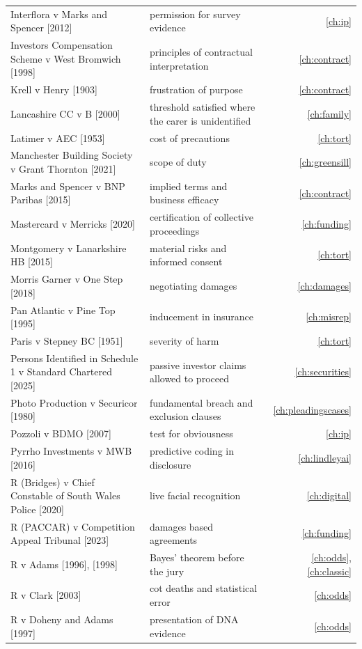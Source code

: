 \begin{longtable}{>{\raggedright\arraybackslash}p{3.7cm} >{\raggedright\arraybackslash}p{5.6cm} r}
Interflora v Marks and Spencer [2012] & permission for survey evidence & \ref{ch:ip}\\
Investors Compensation Scheme v West Bromwich [1998] & principles of contractual interpretation & \ref{ch:contract}\\
Krell v Henry [1903] & frustration of purpose & \ref{ch:contract}\\
Lancashire CC v B [2000] & threshold satisfied where the carer is unidentified & \ref{ch:family}\\
Latimer v AEC [1953] & cost of precautions & \ref{ch:tort}\\
Manchester Building Society v Grant Thornton [2021] & scope of duty & \ref{ch:greensill}\\
Marks and Spencer v BNP Paribas [2015] & implied terms and business efficacy & \ref{ch:contract}\\
Mastercard v Merricks [2020] & certification of collective proceedings & \ref{ch:funding}\\
Montgomery v Lanarkshire HB [2015] & material risks and informed consent & \ref{ch:tort}\\
Morris Garner v One Step [2018] & negotiating damages & \ref{ch:damages}\\
Pan Atlantic v Pine Top [1995] & inducement in insurance & \ref{ch:misrep}\\
Paris v Stepney BC [1951] & severity of harm & \ref{ch:tort}\\
Persons Identified in Schedule 1 v Standard Chartered [2025] & passive investor claims allowed to proceed & \ref{ch:securities}\\
Photo Production v Securicor [1980] & fundamental breach and exclusion clauses & \ref{ch:pleadingscases}\\
Pozzoli v BDMO [2007] & test for obviousness & \ref{ch:ip}\\
Pyrrho Investments v MWB [2016] & predictive coding in disclosure & \ref{ch:lindleyai}\\
R (Bridges) v Chief Constable of South Wales Police [2020] & live facial recognition & \ref{ch:digital}\\
R (PACCAR) v Competition Appeal Tribunal [2023] & damages based agreements & \ref{ch:funding}\\
R v Adams [1996], [1998] & Bayes' theorem before the jury & \ref{ch:odds}, \ref{ch:classic}\\
R v Clark [2003] & cot deaths and statistical error & \ref{ch:odds}\\
R v Doheny and Adams [1997] & presentation of DNA evidence & \ref{ch:odds}\\

\end{longtable}
